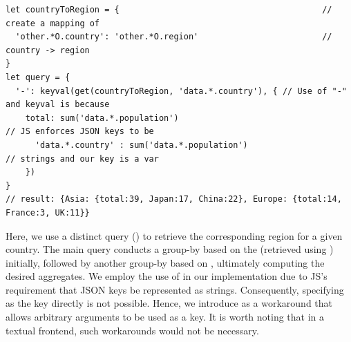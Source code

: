 \documentclass[runningheads]{llncs}
\begin{document}
\begin{lstlisting}[style=JavaScript, columns=flexible]
let countryToRegion = {                                         // create a mapping of 
  'other.*O.country': 'other.*O.region'                         // country -> region
}
let query = {
  '-': keyval(get(countryToRegion, 'data.*.country'), { // Use of "-" and keyval is because
    total: sum('data.*.population')                                       // JS enforces JSON keys to be
      'data.*.country' : sum('data.*.population')                         // strings and our key is a var
    })
}
// result: {Asia: {total:39, Japan:17, China:22}, Europe: {total:14, France:3, UK:11}}
\end{lstlisting}

Here, we use a distinct query () to retrieve the
corresponding region for a given country.
The main query conducts a group-by based on the  (retrieved using ) initially,
followed by another group-by based on , ultimately computing the
desired aggregates.
 We employ the use of  in our implementation due to JS's requirement that JSON
keys be represented as strings.
Consequently, specifying  as the key directly
is not possible.
Hence, we introduce  as a workaround that allows arbitrary
arguments to be used as a key.
It is worth noting that in a textual frontend, such workarounds would not be necessary.



\end{document}
